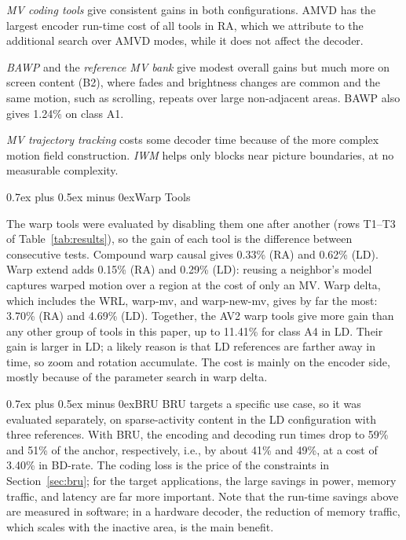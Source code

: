 \documentclass[journal]{IEEEtran}
\makeatletter
\def\subsection{\@startsection{subsection}{2}{\z@}{2.5ex plus 1ex minus 1ex}%
{0.7ex plus 0.5ex minus 0ex}{\normalfont\normalsize\itshape}}%
\makeatother
\begin{document}
\emph{MV coding tools} give consistent gains in both configurations. AMVD has
the largest encoder run-time cost of all tools in RA, which we attribute to
the additional search over AMVD modes, while it does not affect the decoder.

\emph{BAWP} and the \emph{reference MV bank} give modest overall gains but
much more on screen content (B2), where fades and brightness changes are
common and the same motion, such as scrolling, repeats over large non-adjacent
areas. BAWP also gives 1.24\% on class A1.

\emph{MV trajectory tracking} costs some decoder time because of the more
complex motion field construction. \emph{IWM} helps only blocks near picture
boundaries, at no measurable complexity.

\subsection{Warp Tools}

The warp tools were evaluated by disabling them one after another
(rows T1--T3 of Table~\ref{tab:results}), so the gain of each tool is the
difference between consecutive tests. Compound warp causal gives 0.33\% (RA)
and 0.62\% (LD). Warp extend adds 0.15\% (RA) and 0.29\% (LD): reusing a
neighbor's model captures warped motion over a region at the cost of only an
MV. Warp delta, which includes the WRL, warp-mv, and warp-new-mv, gives by far
the most: 3.70\% (RA) and 4.69\% (LD). Together, the AV2 warp tools give more
gain than any other group of tools in this paper, up to 11.41\% for class A4
in LD. Their gain is larger in LD; a likely reason is that LD references are
farther away in time, so zoom and rotation accumulate. The cost is mainly on
the encoder side, mostly because of the parameter search in warp delta.

\subsection{BRU}
BRU targets a specific use case, so it was evaluated separately, on
sparse-activity content in the LD configuration with three references. With
BRU, the encoding and decoding run times drop to 59\% and 51\% of the anchor,
respectively, i.e., by about 41\% and 49\%, at a cost of 3.40\% in BD-rate.
The coding loss is the price of the constraints in Section~\ref{sec:bru}; for
the target applications, the large savings in power, memory traffic, and
latency are far more important. Note that the run-time savings above are
measured in software; in a hardware decoder, the reduction of memory traffic,
which scales with the inactive area, is the main benefit.
\end{document}
